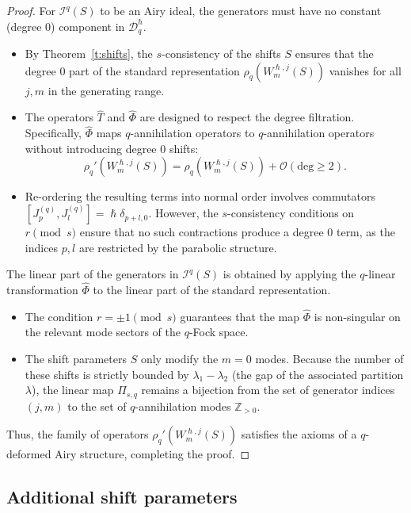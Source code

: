 \documentclass[reqno,11pt]{amsart}
\theoremstyle{plain}
\theoremstyle{definition}
\theoremstyle{remark}
\numberwithin{equation}{section}
\newcommand{\1}{\mathds{1}}
\newcommand{\2}{\frac{1}{2}}
\begin{document}
{\begin{proof}
					{For $\mathcal{I}^q(S)$ to be an Airy ideal, the generators must have no constant (degree 0) component in $\mathcal{D}_q^\hslash$.
						\begin{itemize}
							\item[(i)] By Theorem~\ref{t:shifts}, the $s$-consistency of the shifts $S$ ensures that the degree 0 part of the standard representation $\rho_q(W^{\hslash,j}_m(S))$ vanishes for all $j, m$ in the generating range.
							\item[(ii)] The operators $\hat{T}$  and $\hat{\Phi}$ are designed to respect the degree filtration. Specifically, $\hat{\Phi}$ maps $q$-annihilation operators to $q$-annihilation operators without introducing degree 0 shifts:
							\begin{equation}
								\rho_q'(W^{\hslash,j}_m(S)) = \rho_q(W^{\hslash,j}_m(S)) + \mathcal{O}(\text{deg} \geq 2).
							\end{equation}
							\item[(iii)] Re-ordering the resulting terms into normal order involves commutators $[J^{(q)}_p, J^{(q)}_l] = \hslash \delta_{p+l,0}$. However, the $s$-consistency conditions on $r \pmod{s}$ ensure that no such contractions produce a degree 0 term, as the indices $p, l$ are restricted by the parabolic structure.
					\end{itemize}}
					
					{The linear part of the generators in $\mathcal{I}^q(S)$ is obtained by applying the $q$-linear transformation $\hat{\Phi}$ to the linear part of the standard representation. 
						\begin{itemize}
							\item The condition $r = \pm 1 \pmod{s}$ guarantees that the map $\hat{\Phi}$ is non-singular on the relevant mode sectors of the $q$-Fock space.
							\item The shift parameters $S$ only modify the $m=0$ modes. Because the number of these shifts is strictly bounded by $\lambda_1 - \lambda_2$ (the gap of the associated partition $\lambda$), the linear map $\Pi_{s,q}$ remains a bijection from the set of generator indices $(j,m)$ to the set of $q$-annihilation modes $\mathbb{Z}_{>0}$.
						\end{itemize}
						Thus, the family of operators $\rho_q'(W^{\hslash,j}_m(S))$ satisfies the axioms of a $q$-deformed Airy structure, completing the proof.}
				\end{proof}
				\subsection{Additional shift parameters}
				
}
\end{document}
